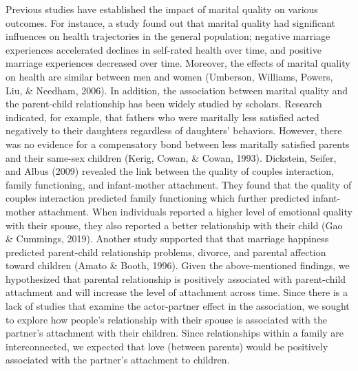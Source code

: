 \documentclass[man]{apa6}
\begin{document}
Previous studies have established the impact of marital quality on various outcomes. For instance, a study found out that marital quality had significant influences on health trajectories in the general population; negative marriage experiences accelerated declines in self-rated health over time, and positive marriage experiences decreased over time. Moreover, the effects of marital quality on health are similar between men and women (Umberson, Williams, Powers, Liu, \& Needham, 2006). In addition, the association between marital quality and the parent-child relationship has been widely studied by scholars. Research indicated, for example, that fathers who were maritally less satisfied acted negatively to their daughters regardless of daughters' behaviors. However, there was no evidence for a compensatory bond between less maritally satisfied parents and their same-sex children (Kerig, Cowan, \& Cowan, 1993). Dickstein, Seifer, and Albus (2009) revealed the link between the quality of couples interaction, family functioning, and infant-mother attachment. They found that the quality of couples interaction predicted family functioning which further predicted infant-mother attachment. When individuals reported a higher level of emotional quality with their spouse, they also reported a better relationship with their child (Gao \& Cummings, 2019). Another study supported that that marriage happiness predicted parent-child relationship problems, divorce, and parental affection toward children (Amato \& Booth, 1996). Given the above-mentioned findings, we hypothesized that parental relationship is positively associated with parent-child attachment and will increase the level of attachment across time. Since there is a lack of studies that examine the actor-partner effect in the association, we sought to explore how people's relationship with their spouse is associated with the partner's attachment with their children. Since relationships within a family are interconnected, we expected that love (between parents) would be positively associated with the partner's attachment to children.
\end{document}
